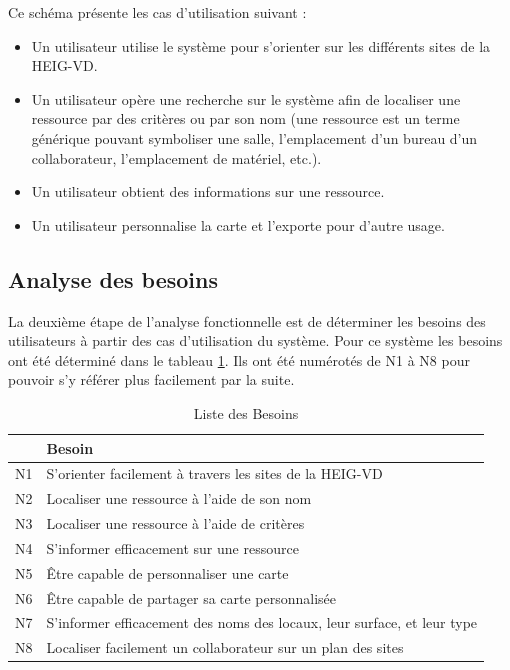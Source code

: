 \documentclass[
    iai, %
    il, %
]{heig-tb}
\begin{document}
\newpage
Ce schéma présente les cas d'utilisation suivant :
\begin{itemize}
    \item Un utilisateur utilise le système pour s'orienter sur les différents sites de la HEIG-VD.
    \item Un utilisateur opère une recherche sur le système afin de localiser une ressource par des critères ou par son nom (une ressource est un terme générique pouvant symboliser une salle, l'emplacement d'un bureau d'un collaborateur, l'emplacement de matériel, etc.).
    \item Un utilisateur obtient des informations sur une ressource.
    \item Un utilisateur personnalise la carte et l'exporte pour d'autre usage.
\end{itemize}

\subsection{Analyse des besoins}
La deuxième étape de l'analyse fonctionnelle est de déterminer les besoins des utilisateurs à partir des cas d'utilisation du système.
Pour ce système les besoins ont été déterminé dans le tableau \ref{besoins}. Ils ont été numérotés de N1 à N8 pour pouvoir s'y référer plus facilement par la suite.
\begin{table}[h]
    \begin{center}
        \caption{Liste des Besoins \label{besoins}}
        \begin{tabular}{l|l}
               & Besoin                                                                  \\ \hline
            N1 & S'orienter facilement à travers les sites de la HEIG-VD                 \\
            N2 & Localiser une ressource à l'aide de son nom                             \\
            N3 & Localiser une ressource à l'aide de critères                            \\
            N4 & S'informer efficacement sur une ressource                               \\
            N5 & Être capable de personnaliser une carte                                 \\
            N6 & Être capable de partager sa carte personnalisée                         \\
            N7 & S'informer efficacement des noms des locaux, leur surface, et leur type \\
            N8 & Localiser facilement un collaborateur sur un plan des sites
        \end{tabular}
    \end{center}
\end{table}
\end{document}
